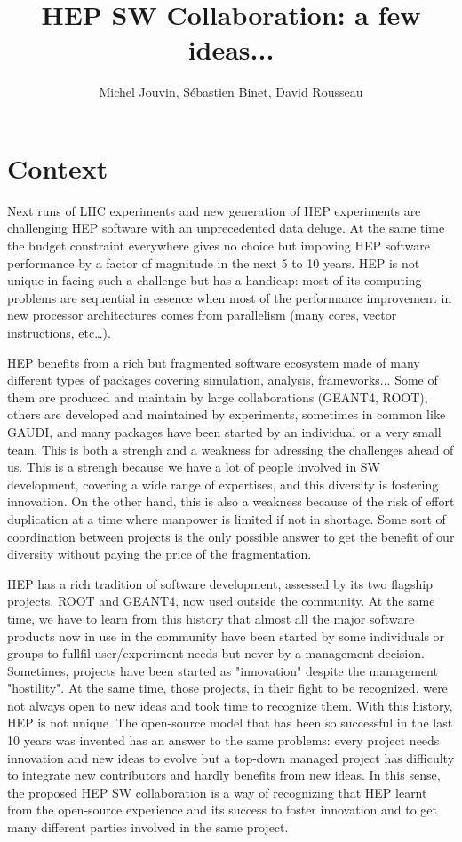 \documentclass[11pt]{article} %
\title{HEP SW Collaboration: a few ideas...}
\author{Michel Jouvin, S\'ebastien Binet, David Rousseau}
\begin{document}
\maketitle

\section{Context}

Next runs of LHC experiments and new generation of HEP experiments are
challenging HEP software with an unprecedented data deluge. At the
same time the budget constraint everywhere gives no choice but
impoving HEP software performance by a factor of magnitude in the next
5 to 10 years. HEP is not unique in facing such a challenge but has a
handicap: most of its computing problems are sequential in essence
when most of the performance improvement in new processor
architectures comes from parallelism (many cores, vector
instructions, etc\ldots).

HEP benefits from a rich but fragmented software ecosystem made of
many different types of packages covering simulation, analysis,
frameworks... Some of them are produced and maintain by large
collaborations (GEANT4, ROOT), others are developed and maintained by
experiments, sometimes in common like GAUDI, and many packages have
been started by an individual or a very small team. This is both a
strengh and a weakness for adressing the challenges ahead of us. This
is a strengh because we have a lot of people involved in SW
development, covering a wide range of expertises, and this diversity is
fostering innovation. On the other hand, this is also a weakness
because of the risk of effort duplication at a time where manpower is
limited if not in shortage. Some sort of coordination between projects
is the only possible answer to get the benefit of our diversity
without paying the price of the fragmentation.

HEP has a rich tradition of software development, assessed by its two
flagship projects, ROOT and GEANT4, now used outside the community. At
the same time, we have to learn from this history that almost all the
major software products now in use in the community have been started
by some individuals or groups to fullfil user/experiment needs but
never by a management decision. Sometimes, projects have been started
as "innovation" despite the management "hostility". At the same time,
those projects, in their fight to be recognized, were not always open
to new ideas and took time to recognize them. With this history, HEP
is not unique. The open-source model that has been so successful in
the last 10 years was invented has an answer to the same problems:
every project needs innovation and new ideas to evolve but a top-down
managed project has difficulty to integrate new contributors and
hardly benefits from new ideas. In this sense, the proposed HEP SW
collaboration is a way of recognizing that HEP learnt from the
open-source experience and its success to foster innovation and to get
many different parties involved in the same project.
\end{document}
